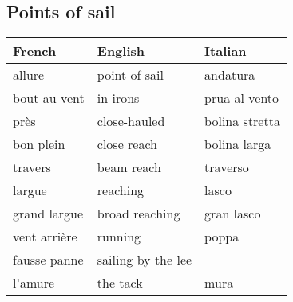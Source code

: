 \documentclass[a4paper, 12pt, twoside]{article}
\begin{document}
    \begin{indt}{\section{Points of sail}} %
        \begin{tabular}{|l|l|l|}
            \hline %
            \textbf{French}
            & \textbf{English}
            & \textbf{Italian}
            \\
            \hline
            \hline %
            allure %
            & point of sail
            & andatura
            \\
            \hline %
            bout au vent %
            & in irons
            & prua al vento
            \\
            \hline %
            près %
            & close-hauled
            & bolina stretta
            \\
            \hline %
            bon plein %
            & close reach
            & bolina larga
            \\
            \hline %
            travers %
            & beam reach
            & traverso
            \\
            \hline %
            largue %
            & reaching
            & lasco
            \\
            \hline %
            grand largue %
            & broad reaching
            & gran lasco
            \\
            \hline %
            vent arrière %
            & running
            & poppa
            \\
            \hline %
            fausse panne %
            & sailing by the lee
            &
            \\
            \hline %
            l'amure %
            & the tack
            & mura
            \\
            \hline %
        \end{tabular}
    \end{indt} %
\end{document}
